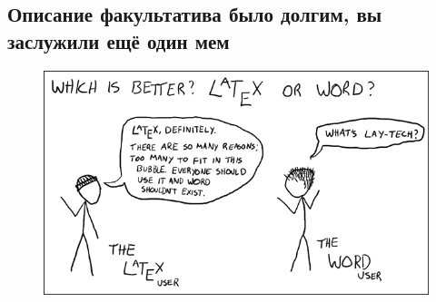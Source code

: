 \documentclass[12pt, a4paper, oneside]{article}
\begin{document}
 \subsection*{Описание факультатива было долгим, вы заслужили ещё один мем} 
 
 \begin{figure}[H]\label{pic:2}
 	\begin{center}
 		\includegraphics[scale=0.7]{joke_2.png}
 	\end{center}
 \end{figure}
\end{document}
